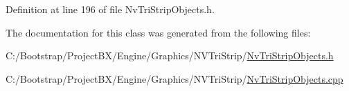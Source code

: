 Definition at line 196 of file NvTriStripObjects.h.

The documentation for this class was generated from the following files:\begin{CompactItemize}
\item 
C:/Bootstrap/ProjectBX/Engine/Graphics/NVTriStrip/\hyperlink{_nv_tri_strip_objects_8h}{NvTriStripObjects.h}\item 
C:/Bootstrap/ProjectBX/Engine/Graphics/NVTriStrip/\hyperlink{_nv_tri_strip_objects_8cpp}{NvTriStripObjects.cpp}\end{CompactItemize}

